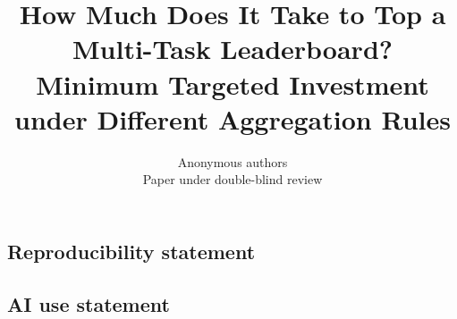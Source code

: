 \documentclass{article}
\title{How Much Does It Take to Top a Multi-Task Leaderboard? Minimum Targeted Investment under Different Aggregation Rules}
\author{Anonymous authors\\Paper under double-blind review}
\begin{document}
\maketitle

\begin{abstract}

\end{abstract}







\subsection*{Reproducibility statement}





\appendix


\subsection*{AI use statement}

\end{document}
